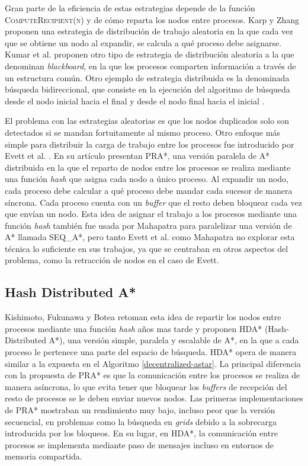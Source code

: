 \documentclass[a4paper,12pt]{article}
\begin{document}
Gran parte de la eficiencia de estas estrategias depende de la función \textsc{ComputeRecipient(n)} y de cómo reparta los nodos entre procesos. Karp y Zhang \cite{karp1988randomized, karp1993randomized} proponen una estrategia de distribución de trabajo aleatoria en la que cada vez que se obtiene un nodo al expandir, se calcula a qué proceso debe asignarse. Kumar et al. \cite{kumar1988parallel} proponen otro tipo de estrategia de distribución aleatoria a la que denominan \textit{blackboard}, en la que los procesos comparten información a través de un estructura común. Otro ejemplo de estrategia distribuida es la denominada búsqueda bidireccional, que consiste en la ejecución del algoritmo de búsqueda desde el nodo inicial hacia el final y desde el nodo final hacia el inicial \cite{rios2011pnba}.

El problema con las estrategias aleatorias es que los nodos duplicados solo son detectados si se mandan fortuitamente al mismo proceso. Otro enfoque más simple para distribuir la carga de trabajo entre los procesos fue introducido por Evett et al. \cite{evett1995massively}. En su artículo presentan PRA*, una versión paralela de A* distribuida en la que el reparto de nodos entre los procesos se realiza mediante una función \textit{hash} que asigna cada nodo a único proceso. Al expandir un nodo, cada proceso debe calcular a qué proceso debe mandar cada sucesor de manera síncrona. Cada proceso cuenta con un \textit{buffer} que el resto deben bloquear cada vez que envían un nodo. Esta idea de asignar el trabajo a los procesos mediante una función \textit{hash} también fue usada por Mahapatra \cite{mahapatra2002scalable} para paralelizar una versión de A* llamada SEQ\_A*, pero tanto Evett et al. como Mahapatra no explorar esta técnica lo suficiente en sus trabajos, ya que se centraban en otros aspectos del problema, como la retracción de nodos en el caso de Evett.

\subsection{Hash Distributed A*}

Kishimoto, Fukunawa y Botea \cite{kishimoto2009scalable, kishimoto2013evaluation} retoman esta idea de repartir los nodos entre procesos mediante una función \textit{hash} años mas tarde y proponen HDA* (Hash-Distributed A*), una versión simple, paralela y escalable de A*, en la que a cada proceso le pertenece una parte del espacio de búsqueda. HDA* opera de manera similar a la expuesta en el Algoritmo \ref{decentralized-astar}. La principal diferencia con la propuesta de PRA* es que la comunicación entre los procesos se realiza de manera asíncrona, lo que evita tener que bloquear los \textit{buffers} de recepción del resto de procesos se le deben enviar nuevos nodos. Las primeras implementaciones de PRA* mostraban un rendimiento muy bajo, incluso peor que la versión secuencial, en problemas como la búsqueda en \textit{grids} \cite{burns2010best} debido a la sobrecarga introducida por los bloqueos. En su lugar, en HDA*, la comunicación entre procesos se implementa mediante paso de mensajes incluso en entornos de memoria compartida.
\end{document}
